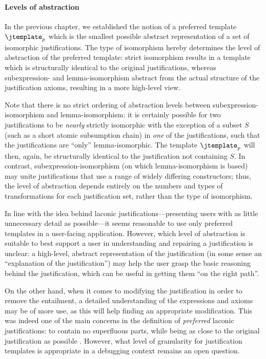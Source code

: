 \paragraph{Levels of abstraction}
In the previous chapter, we established the notion of a preferred template $\jtemplate_{p}$ which is the smallest possible abstract representation of a set of isomorphic justifications. The type of isomorphism hereby determines the level of abstraction of the preferred template: strict isomorphism results in a template which is structurally identical to the original justifications, whereas subexpression- and lemma-isomorphism abstract from the actual structure of the justification axioms, resulting in a more high-level view. 

Note that there is no strict ordering of abstraction levels between subexpression-isomorphism and lemma-isomorphism: it is certainly possible for two justifications to be \emph{nearly} strictly isomorphic with the exception of a subset $S$ (such as a short atomic subsumption chain) in \emph{one}  of the justifications, such that the justifications are \enquote{only} lemma-isomorphic. The template $\jtemplate_{p}$ will then, again, be structurally identical to the justification not containing $S$. In contrast, subexpression-isomorphism (on which lemma-isomorphism is based) may unite justifications that use a range of widely differing constructors; thus, the level of abstraction depends entirely on the numbers and types of transformations for each justification set, rather than the type of isomorphism.

In line with the idea behind laconic justifications---presenting users with as little unnecessary detail as possible---it seems reasonable to use only preferred templates in a user-facing application. However, which level of abstraction is suitable to best support a user in understanding and repairing a justification is unclear: a high-level, abstract representation of the justification (in some sense an \enquote{explanation of the justification}) may help the user grasp the basic reasoning behind the justification, which can be useful in getting them \enquote{on the right path}. 

On the other hand, when it comes to modifying the justification in order to remove the entailment, a detailed understanding of the expressions and axioms may be of more use, as this will help finding an appropriate modification. This was indeed one of the main concerns in the definition of \emph{preferred} laconic justifications: to contain no superfluous parts, while being as close to the original justification as possible \cite{horridge08yi}. However, what level of granularity for justification templates is appropriate in a debugging context remains an open question.

